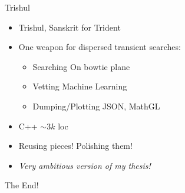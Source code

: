 
\begin{frame}{Trishul}
\begin{itemize}
	\item Trishul, Sanskrit for Trident
	\item One weapon for dispersed transient searches:
		\begin{itemize}
			\item Searching \hfill On bowtie plane
			\item Vetting   \hfill Machine Learning
			\item Dumping/Plotting \hfill JSON, MathGL
		\end{itemize}
	\item C++ $\sim 3k$ loc
	\item Reusing pieces! \hfill Polishing them!
	\item \emph{Very ambitious version of my thesis!}
\end{itemize}
\vspace{\vfill}
{\Huge The End!}
\vspace{\vfill}
\end{frame}
